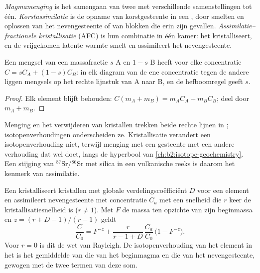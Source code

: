 \begin{definition}
\label{def:b2:magmatic-differentiation:open}
\emph{Magmamenging} is het samengaan van twee  met verschillende
samenstellingen tot één. \emph{Korstassimilatie} is de
opname van korstgesteente in een , door smelten en oplossen van het
nevengesteente of van blokken die erin zijn gevallen.
\emph{Assimilatie--fractionele kristallisatie} (AFC) is hun
combinatie in één kamer: het  kristalliseert, en de vrijgekomen latente warmte
smelt en assimileert het nevengesteente.
\end{definition}

\begin{proposition}\label{prop:b2:magmatic-differentiation:mixing}
Een mengsel van een massafractie $s$  A en $1-s$  B heeft voor elke
concentratie $C = sC_A + (1-s)C_B$: in elk diagram van de ene concentratie tegen
de andere liggen mengsels op het rechte lijnstuk van A naar B, en de hefboomregel geeft
$s$.
\end{proposition}

\begin{proof}
Elk element blijft behouden: $C(m_A + m_B) = m_AC_A + m_BC_B$; deel door $m_A + m_B$.
\end{proof}

Menging en het verwijderen van kristallen trekken beide rechte lijnen in ;
isotopenverhoudingen onderscheiden ze. Kristallisatie verandert een isotopenverhouding niet, terwijl
menging met een gesteente met een andere verhouding dat wel doet, langs de hyperbool van
\cref{ch:b2:isotope-geochemistry}. Een stijging van $^{87}$Sr/$^{86}$Sr met silica in een
vulkanische reeks is daarom het kenmerk van assimilatie.

\begin{proposition}
\label{prop:b2:magmatic-differentiation:afc}
Een  kristalliseert kristallen met globale verdelingscoëfficiënt $D$ voor een element
en assimileert nevengesteente met concentratie $C_a$ met een snelheid die $r$ keer de
kristallisatiesnelheid is ($r \ne 1$). Met $F$ de massa  ten opzichte van zijn
beginmassa en $z = (r + D - 1)/(r - 1)$ geldt
\[
\frac{C}{C_0} = F^{-z} + \frac{r}{r - 1 + D}\,\frac{C_a}{C_0}\,\bigl(1 - F^{-z}\bigr).
\]
Voor $r = 0$ is dit de wet van Rayleigh. De isotopenverhouding van het element in het 
is het gemiddelde van die van het beginmagma en die van het nevengesteente, gewogen met de
twee termen van deze som.
\end{proposition}

